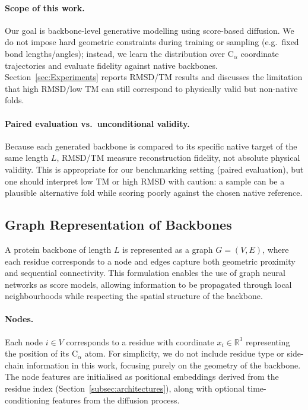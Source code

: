 \documentclass[a4paper,12pt]{article}
\begin{document}
\paragraph{Scope of this work.}
Our goal is backbone-level generative modelling using score-based diffusion. We do not impose hard geometric constraints during training or sampling (e.g.\ fixed bond lengths/angles); instead, we learn the distribution over C\(_\alpha\) coordinate trajectories and evaluate fidelity against native backbones. Section~\ref{sec:Experiments} reports RMSD/TM results and discusses the limitation that high RMSD/low TM can still correspond to physically valid but non-native folds.

\paragraph{Paired evaluation vs.\ unconditional validity.}
Because each generated backbone is compared to its specific native target of the same length \(L\), RMSD/TM measure reconstruction fidelity, not absolute physical validity. 
This is appropriate for our benchmarking setting (paired evaluation), but one should interpret low TM or high RMSD with caution: a sample can be a plausible alternative fold while scoring poorly against the chosen native reference.

\subsection{Graph Representation of Backbones}\label{subsec:graph-repr}
A protein backbone of length \(L\) is represented as a graph \(G=(V,E)\), where each residue corresponds to a node and edges capture both geometric proximity and sequential connectivity. This formulation enables the use of graph neural networks as score models, allowing information to be propagated through local neighbourhoods while respecting the spatial structure of the backbone. 

\paragraph{Nodes.}
Each node \(i \in V\) corresponds to a residue with coordinate \(x_i \in \mathbb{R}^3\) representing the position of its C\(_\alpha\) atom. For simplicity, we do not include residue type or side-chain information in this work, focusing purely on the geometry of the backbone. The node features are initialised as positional embeddings derived from the residue index (Section~\ref{subsec:architectures}), along with optional time-conditioning features from the diffusion process.
\end{document}
